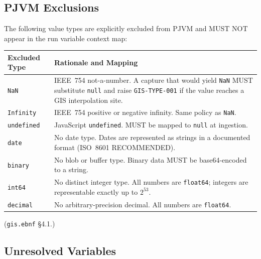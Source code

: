 \subsection{PJVM Exclusions}
\label{subsec:gis:pjvm-exclusions}

The following value types are explicitly excluded from PJVM and MUST NOT
appear in the run variable context map:

\begin{center}
\begin{tabular}{lp{9.5cm}}
\hline
\textbf{Excluded Type} & \textbf{Rationale and Mapping} \\
\hline
\texttt{NaN}       & IEEE~754 not-a-number.
                     A capture that would yield \texttt{NaN} MUST
                     substitute \texttt{null} and raise
                     \texttt{GIS-TYPE-001} if the value reaches
                     a GIS interpolation site. \\
\texttt{Infinity}  & IEEE~754 positive or negative infinity.
                     Same policy as \texttt{NaN}. \\
\texttt{undefined} & JavaScript \texttt{undefined}.
                     MUST be mapped to \texttt{null} at ingestion. \\
\texttt{date}      & No date type.  Dates are represented as strings
                     in a documented format (ISO~8601 RECOMMENDED). \\
\texttt{binary}    & No blob or buffer type.
                     Binary data MUST be base64-encoded to a string. \\
\texttt{int64}     & No distinct integer type.
                     All numbers are \texttt{float64}; integers are
                     representable exactly up to $2^{53}$. \\
\texttt{decimal}   & No arbitrary-precision decimal.
                     All numbers are \texttt{float64}. \\
\hline
\end{tabular}
\end{center}

(\texttt{gis.ebnf} \S4.1.)

\subsection{Unresolved Variables}
\label{subsec:gis:unresolved}

